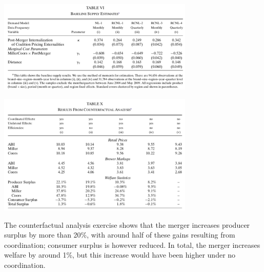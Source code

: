 \documentclass[11pt]{article}
\numberwithin{equation}{section}
\begin{document}
\begin{center}
	\includegraphics[width=0.7\textwidth]{mw2}
\end{center}


\begin{center}
	\includegraphics[width=0.7\textwidth]{mw3}
\end{center}

The counterfactual analysis exercise shows that the merger increases producer surplus by more than 20\%, with around half of these gains resulting from coordination; consumer surplus is however reduced.
In total, the merger increases welfare by around 1\%, but this increase would have been higher under no coordination.


\appendix
\end{document}
